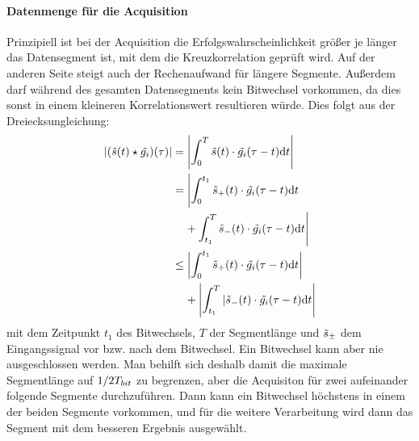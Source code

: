 \paragraph{Datenmenge für die Acquisition}
Prinzipiell ist bei der Acquisition die Erfolgswahrscheinlichkeit größer je länger das Datensegment ist, mit dem die Kreuzkorrelation geprüft wird. Auf der anderen Seite steigt auch der Rechenaufwand für längere Segmente. Außerdem darf während des gesamten Datensegments kein Bitwechsel vorkommen, da dies sonst in einem kleineren Korrelationswert resultieren würde. Dies folgt aus der Dreiecksungleichung:
\begin{align}
   |(\tilde{s}(t) \star \tilde{g_i})(\tau)|  &= \left|\int_0^T{\tilde{s}(t) \cdot \tilde{g_i}(\tau -t) \textrm{d}t}\right| \\  
&= \Biggl|\int_0^{t_1}{\tilde{s}_+(t) \cdot \tilde{g_i}(\tau -t) \textrm{d}t}\\
     &\phantom{=~}+ \int_{t_1}^T{\tilde{s}_-(t) \cdot \tilde{g_i}(\tau -t) \textrm{d}t}\Biggl|\\
   &\leq \left|\int_0^{t_1}{\tilde{s}_+(t) \cdot \tilde{g_i}(\tau -t) \textrm{d}t}\right| \notag\\
    &\phantom{\leq~} + \left|\int_{t_1}^T{|\tilde{s}_-(t) \cdot \tilde{g_i}(\tau -t) \textrm{d}t}\right|
\end{align}
mit dem Zeitpunkt $t_1$ des Bitwechsels, $T$ der Segmentlänge und $\tilde{s}_{\pm}$ dem Eingangssignal vor bzw. nach dem Bitwechsel. Ein Bitwechsel kann aber nie ausgeschlossen werden. Man behilft sich deshalb damit die maximale Segmentlänge auf $1/2 {T}_{bit}$ zu begrenzen, aber die Acquisiton für zwei aufeinander folgende Segmente durchzuführen. Dann kann ein Bitwechsel höchstens in einem der beiden Segmente vorkommen, und für die weitere Verarbeitung wird dann das Segment mit dem besseren Ergebnis ausgewählt.



